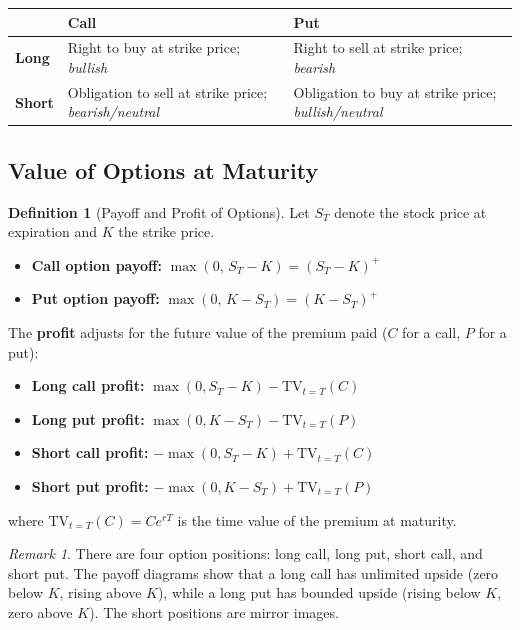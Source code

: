 \documentclass[12pt, a4paper]{article}
\theoremstyle{plain}
\theoremstyle{definition}
\newtheorem{definition}[theorem]{Definition}
\theoremstyle{remark}
\newtheorem{remark}[theorem]{Remark}
\begin{document}
\begin{center}
\begin{tabular}{lll}
  \hline
  & \textbf{Call} & \textbf{Put} \\
  \hline
  \textbf{Long} & Right to buy at strike price; \emph{bullish} & Right to sell at strike price; \emph{bearish} \\
  \textbf{Short} & Obligation to sell at strike price; \emph{bearish/neutral} & Obligation to buy at strike price; \emph{bullish/neutral} \\
  \hline
\end{tabular}
\end{center}

\pagebreak
\subsection{Value of Options at Maturity}

\begin{definition}[Payoff and Profit of Options]
  Let $S_T$ denote the stock price at expiration and $K$ the strike price.
  \begin{itemize}
    \item \textbf{Call option payoff:} $\max(0,\, S_T - K) = (S_T - K)^+$
    \item \textbf{Put option payoff:} $\max(0,\, K - S_T) = (K - S_T)^+$
  \end{itemize}
  The \textbf{profit} adjusts for the future value of the premium paid ($C$ for a call, $P$ for a put):
  \begin{itemize}
    \item \textbf{Long call profit:} $\max(0, S_T - K) - \mathrm{TV}_{t=T}(C)$
    \item \textbf{Long put profit:} $\max(0, K - S_T) - \mathrm{TV}_{t=T}(P)$
    \item \textbf{Short call profit:} $-\max(0, S_T - K) + \mathrm{TV}_{t=T}(C)$
    \item \textbf{Short put profit:} $-\max(0, K - S_T) + \mathrm{TV}_{t=T}(P)$
  \end{itemize}
  where $\mathrm{TV}_{t=T}(C) = Ce^{rT}$ is the time value of the premium at maturity.
\end{definition}

\begin{remark}
  There are four option positions: long call, long put, short call, and short put. The payoff diagrams show that a long call has unlimited upside (zero below $K$, rising above $K$), while a long put has bounded upside (rising below $K$, zero above $K$). The short positions are mirror images.
\end{remark}
\end{document}
